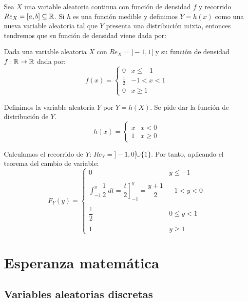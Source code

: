 Sea $X$ una variable aleatoria continua con función de densidad $f$ y recorrido $Re_X=[a,b]\subseteq \mathbb R$. Si $h$ es una función medible y definimos $Y=h(x)$ como una nueva variable aleatoria tal que $Y$ presenta una distribución mixta, entonces tendremos que su función de densidad viene dada por:
\begin{ejemplo}
    Dada una variable aleatoria $X$ con $Re_X = ]-1, 1[$ y su función de densidad $f:\mathbb R \rightarrow \mathbb R$ dada por:
    $$f(x) = \left\{ \begin{array}{ll}
        0           & x \leq -1  \\
        \frac{1}{2} & -1 < x < 1 \\
        0           & x \geq 1
    \end{array} \right. $$

    Definimos la variable aleatoria $Y$ por $Y=h(X)$. Se pide dar la función de distribución de $Y$.
    $$h(x) = \left\{ \begin{array}{ll}
        x & x < 0    \\
        1 & x \geq 0
    \end{array} \right.$$

        
    Calculamos el recorrido de $Y$: $Re_Y = ]-1, 0[ \cup \{1\}$. Por tanto, aplicando el teorema del cambio de variable:
    $$F_Y(y) = \left\{ \begin{array}{cl}
        0 & y \leq -1    \\ \\
        \displaystyle\int_{-1}^y \dfrac{1}{2}~dt = \left. \dfrac{t}{2} \right]_{-1}^y = \dfrac{y+1}{2} & -1 < y < 0   \\ \\
        \dfrac{1}{2} & 0 \leq y < 1 \\ \\
        1 & y \geq 1
  \end{array} \right.$$
\end{ejemplo}

\section{Esperanza matemática}
\subsection{Variables aleatorias discretas}

